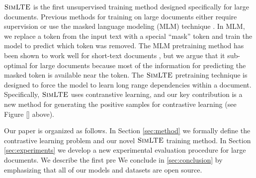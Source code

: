 \documentclass[11pt]{article}
\newcommand{\our}{\mbox{\textsc{SimLTE}}}
\begin{document}
$\our$ is the first unsupervised training method designed specifically for large documents.
Previous methods for training on large documents either require supervision \cite{} or use the masked language modeling (MLM) technique \cite{}.
In MLM, we replace a token from the input text with a special ``mask'' token and train the model to predict which token was removed.
The MLM pretraining method has been shown to work well for short-text documents \cite{},
but we argue that it sub-optimal for large documents because most of the information for predicting the masked token is available near the token.
The $\our$ pretraining technique is designed to force the model to learn long range dependencies within a document.
Specifically, $\our$ uses contranstive learning,
and our key contribution is a new method for generating the positive samples for contrastive learning (see Figure \ref{} above).


Our paper is organized as follows.
In Section \ref{sec:method} we formally define the contrastive learning problem and our novel $\our$ training method.
In Section \ref{sec:experiments} we develop a new experimental evaluation procedure for large documents.
We describe the first pre
We conclude in \ref{sec:conclusion} by emphasizing that all of our models and datasets are open source.

\end{document}
